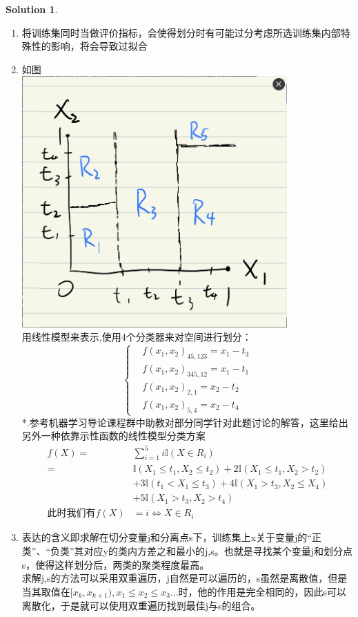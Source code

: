 \documentclass[a4paper,UTF8]{article}
\theoremstyle{definition}
\newtheorem*{solution}{Solution}
\begin{document}
\begin{solution}\ \\
\begin{enumerate}[(1)]
	\item 将训练集同时当做评价指标，会使得划分时有可能过分考虑所选训练集内部特殊性的影响，将会导致过拟合
	\item 如图\\
	\includegraphics[width=0.8\textwidth]{figure/pr12.png}\\
	用线性模型来表示,使用4个分类器来对空间进行划分：
	$$\left\{
	\begin{aligned}
	&f(x_1,x_2)_{45,123} = x_1-t_3 \\
	&f(x_1,x_2)_{345,12} = x_1-t_1 \\
	&f(x_1,x_2)_{2,1} = x_2-t_2\\
	&f(x_1,x_2)_{5,4} = x_2-t_4
	\end{aligned}
	\right.
	$$
	*.参考机器学习导论课程群中助教对部分同学针对此题讨论的解答，这里给出另外一种依靠示性函数的线性模型分类方案\\
	\begin{equation*}
		\begin{split}
			f(X)=&\sum_{i=1}^5 i\mathbb{I}(X \in R_i)\\
			=&\mathbb{I}(X_1 \le t_1,X_2 \le t_2)+2\mathbb{I}(X_1 \le t_1, X_2 > t_2)\\
			&+3\mathbb{I}(t_1 < X_1 \le t_3)+4\mathbb{I}(X_1>t_3,X_2 \le X_4)\\
			&+5\mathbb{I}(X_1 > t_3, X_2 > t_4)\\
		\text{此时我们有}f(X) &= i \iff X \in R_i
		\end{split}
	\end{equation*}
	\item 表达的含义即求解在切分变量j和分离点s下，训练集上x关于变量j的“正类”、“负类”其对应y的类内方差之和最小的j,s。也就是寻找某个变量j和划分点s，使得这样划分后，两类的聚类程度最高。\\
			求解j,s的方法可以采用双重遍历，j自然是可以遍历的，s虽然是离散值，但是当其取值在$[x_k,x_{k+1}),x_1\le x_2 \le x_3...$时，他的作用是完全相同的，因此s可以离散化，于是就可以使用双重遍历找到最佳j与s的组合。
\end{enumerate}
\end{solution}
\end{document}
